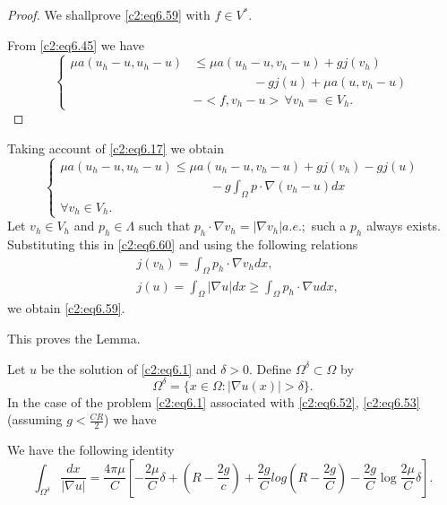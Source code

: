 \begin{proof}
We shall\pageoriginale  prove \eqref{c2:eq6.59} with $f \in V^*$. 

From \eqref{c2:eq6.45} we have 
\begin{equation*}
\begin{cases}
\mu a (u_h -u, u_h - u) & \leq \mu a (u_h -u, v_h - u) + gj (v_h)\\ 
& \hspace{2cm}- gj
(u) + \mu a (u, v_h - u)\\ 
&- < f, v_h - u>\, \forall  v_h = \in V_h. 
\end{cases}
\end{equation*}
\end{proof}
Taking account of \eqref{c2:eq6.17} we obtain
\begin{equation}
\begin{cases}
\mu a (u_h -u, u_h - u)  \leq \mu a (u_h -u, v_h - u) + gj (v_h) - gj
(u)\\
\hspace{5cm}-g \int_\Omega p \cdot \nabla (v_h - u) dx\\ 
\forall v_h \in V_h. 
\end{cases}
\tag{6.60}\label{c2:eq6.60}
\end{equation}
Let $v_h \in V_h$ and $p_h \in \Lambda $ such that $p_h
\cdot \nabla v_h = |\nabla v_h| a. e. ;$ such a $p_h$
always exists. Substituting this in \eqref{c2:eq6.60} and using the
following relations  
\begin{align}
& j (v_h) = \int_\Omega p_h \cdot \nabla v_h dx,
  \tag{6.61}\label{c2:eq6.61}\\  
& j(u) = \int_\Omega |\nabla u| dx \geq \int_\Omega p_h \cdot
  \nabla u dx, \tag{6.62}\label{c2:eq6.62} 
\end{align}
we obtain \eqref{c2:eq6.59}.

This proves the Lemma.

Let $u$ be the solution of \eqref{c2:eq6.1} and $\delta > 0$. Define
$\Omega^\delta \subset \Omega $ by  
$$
\Omega^\delta = \{ x \in \Omega : |\nabla u (x) |> \delta
\}. 
$$
In the case of the problem \eqref{c2:eq6.1} associated with \eqref{c2:eq6.52},
\eqref{c2:eq6.53} (assuming $g < \frac{CR}{2}$) we have  

\begin{lemma}\label{c2:lem6.3}%
We have the following identity 
\begin{equation}
\int_{\Omega^\delta} \frac{dx}{|\nabla u|} = \frac{4 \pi
  \mu}{C} \left[- \frac{2 \mu}{C} \delta + \left(R - \frac{2g}{c}\right)  +
  \frac{2g}{C} log \left(R - \frac{2 g}{C}\right) - \frac{2g}{C} \log \frac{2
    \mu} {C} \delta\right]. \tag{6.63}\label{c2:eq6.63} 
\end{equation}
\end{lemma}

